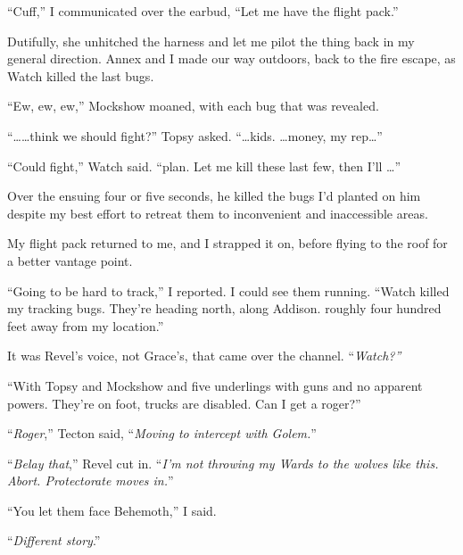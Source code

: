 ``Cuff,'' I communicated over the earbud, ``Let me have the flight pack.''



Dutifully, she unhitched the harness and let me pilot the thing back in my general direction.  Annex and I made our way outdoors, back to the fire escape, as Watch killed the last bugs.



``Ew, ew, ew,'' Mockshow moaned, with each bug that was revealed.



``\ldots \ldots think we should fight?'' Topsy asked.  ``\ldots \ldotsing kids.  \ldots money, my rep\ldots''



``Could fight,'' Watch said.  ``\ldotsther plan.  Let me kill these last few, then I'll \ldots''



Over the ensuing four or five seconds, he killed the bugs I'd planted on him despite my best effort to retreat them to inconvenient and inaccessible areas.



My flight pack returned to me, and I strapped it on, before flying to the roof for a better vantage point.



``Going to be hard to track,'' I reported.  I could see them running.  ``Watch killed my tracking bugs.  They're heading north, along Addison. roughly four hundred feet away from my location.''



It was Revel's voice, not Grace's, that came over the channel.  ``\emph{Watch?''}



``With Topsy and Mockshow and five underlings with guns and no apparent powers.  They're on foot, trucks are disabled.  Can I get a roger?''



``\emph{Roger},'' Tecton said, ``\emph{Moving to intercept with Golem.}''



``\emph{Belay that},'' Revel cut in.  ``\emph{I'm not throwing my Wards to the wolves like this.  Abort.  Protectorate moves in.}''



``You let them face Behemoth,'' I said.



``\emph{Different story}.''



